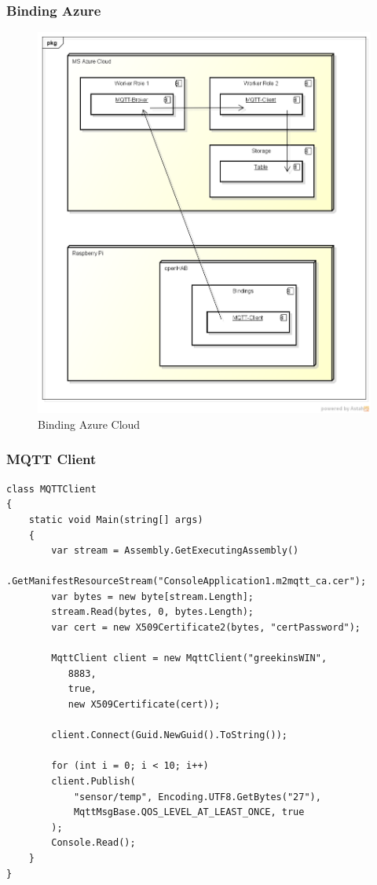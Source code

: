 \subsubsection{Binding Azure}
\begin{figure}[h!]
	\centering
		\includegraphics[scale=0.5]{report/img/deployment_binding_azure}
	\caption{Binding Azure Cloud}
	\label{fig:deploymentAzure}
\end{figure}

\subsubsection{MQTT Client}

\begin{lstlisting}[style=csharp]
class MQTTClient
{
	static void Main(string[] args)
	{
		var stream = Assembly.GetExecutingAssembly()
					.GetManifestResourceStream("ConsoleApplication1.m2mqtt_ca.cer");
		var bytes = new byte[stream.Length];
		stream.Read(bytes, 0, bytes.Length);
		var cert = new X509Certificate2(bytes, "certPassword");

		MqttClient client = new MqttClient("greekinsWIN",
		   8883,
		   true,
		   new X509Certificate(cert));

		client.Connect(Guid.NewGuid().ToString());

		for (int i = 0; i < 10; i++)
		client.Publish(
			"sensor/temp", Encoding.UTF8.GetBytes("27"),
			MqttMsgBase.QOS_LEVEL_AT_LEAST_ONCE, true
		);
		Console.Read();
	}
}
\end{lstlisting}

%

